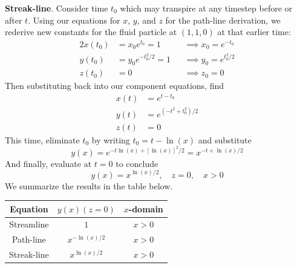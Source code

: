 \documentclass[a4paper]{article}
\begin{document}
\textbf{Streak-line}. Consider time \( t_{0} \) which may transpire at any timestep before or after \( t \). Using our equations for \( x \), \( y \), and \( z \) for the path-line derivation, we rederive new constants for the fluid particle at \( \!\left( 1,1,0 \right) \) at that earlier time:
\begin{alignat*}{2}
	x \!\left( t_{0} \right) & = x_{0}e^{t_{0}} = 1 && \implies x_{0} = e^{-t_{0}} \\
	y \!\left( t_{0} \right) & = y_{0}e^{-t_{0}^{2}/2} = 1 && \implies y_{0} = e^{t_{0}^{2}/2} \\ 
	z \!\left( t_{0} \right) & = 0 && \implies z_{0} = 0
\end{alignat*}
Then substituting back into our component equations, find
\begin{align*}
	x \!\left( t \right) & = e^{t - t_{0}} \\
	y \!\left( t \right) & = e^{\!\left( -t^{2} + t^{2}_{0} \right)/2} \\ 
	z \!\left( t \right) & = 0
\end{align*}
This time, eliminate \( t_{0} \) by writing \( t_{0} = t - \ln\!\left(x\right) \) and substitute
\[
	y \!\left( x \right) = e^{-t \ln\!\left(x\right) + \!\left[ \ln\!\left(x\right) \right]^{2}/2} = x^{-t + \ln\!\left(x\right)/2}
\]
And finally, evaluate at \( t = 0 \) to conclude
\[
	y \!\left( x \right) = x^{\ln\!\left(x\right)/2}, \quad z = 0, \quad x > 0
\]
We summarize the results in the table below.

\begin{center}
	\renewcommand{\arraystretch}{1.8}
	\setlength{\arraycolsep}{10pt}
	\begin{tabular}{|c||c|c|}
		\hline
		\rule[-1.2em]{0pt}{3em}
		Equation & \( y \!\left( x \right) (z = 0) \) & \( x \)-domain \\
		\hline\hline
		\rule[-1.2em]{0pt}{3em}
				Streamline & \( 1 \) & \( x > 0 \) \\
		\hline
		\rule[-1.2em]{0pt}{3em}
				Path-line & \( x^{-\ln\!\left(x\right)/2} \) & \( x > 0 \) \\
		\hline
		\rule[-1.2em]{0pt}{3em}
				Streak-line & \( x^{\ln\!\left(x\right)/2} \) & \( x > 0 \) \\
		\hline
	\end{tabular}
\end{center}
\end{document}
